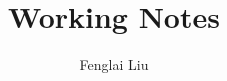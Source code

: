 \documentclass[a4paper,12pt,oneside]{book}
\author{Fenglai Liu}
\title{Working Notes}
\theoremstyle{definition}\newtheorem{law}{Law}
\theoremstyle{plain}\newtheorem{theorem}{Theorem}
\theoremstyle{remark}\newtheorem{remark}{Remark}
\theoremstyle{axiom}\newtheorem{axiom}{Axiom}
\numberwithin{law}{chapter}
\numberwithin{theorem}{chapter}
\numberwithin{remark}{chapter}
\begin{document}
\maketitle
\tableofcontents


\graphicspath{{figure/}}




%
%
%
%
%
%
%
%
%
%
%
%
%
%
%

%
%
%
%
%
%
%
%
%
%
%
%
%


%
%
%
\end{document}
